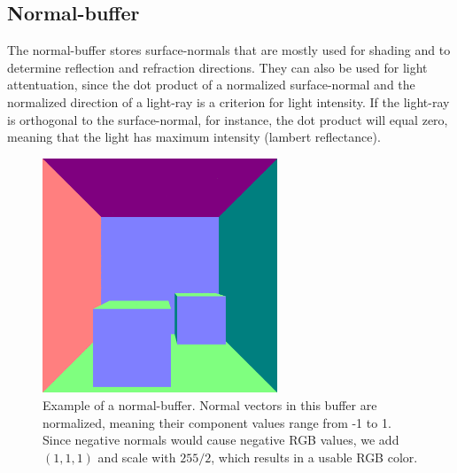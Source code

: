 \documentclass{ACGSeminar}
\begin{document}
	\subsection{Normal-buffer}
		The normal-buffer stores surface-normals that are mostly used for shading and to determine reflection and refraction directions. They can also be used for light attentuation, since the dot product of a normalized surface-normal and the normalized direction of a light-ray is a criterion for light intensity. If the light-ray is orthogonal to the surface-normal, for instance, the dot product will equal zero, meaning that the light has maximum intensity (lambert reflectance).
		\begin{figure}[htb!]%
			\begin{center}%
				\includegraphics[width=7cm]{img/normal_buffer.png}
			\end{center}%
			\caption{Example of a normal-buffer. Normal vectors in this buffer are normalized, meaning their component values range from -1 to 1. Since negative normals would cause negative RGB values, we add $(1, 1, 1)$ and scale with $255/2$, which results in a usable RGB color.}%
			\label{fig:normal_buffer}
		\end{figure}%
\end{document}
